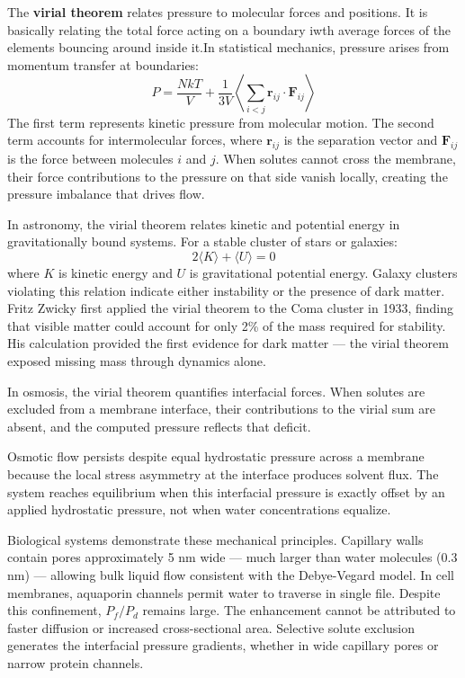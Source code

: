The \textbf{virial theorem} relates pressure to molecular forces and positions. It is basically relating the total force acting on a boundary iwth average forces of the elements bouncing around inside it.In statistical mechanics, pressure arises from momentum transfer at boundaries:
\[
P = \frac{NkT}{V} + \frac{1}{3V}\left\langle \sum_{i<j} \mathbf{r}_{ij} \cdot \mathbf{F}_{ij} \right\rangle
\]
The first term represents kinetic pressure from molecular motion. The second term accounts for intermolecular forces, where $\mathbf{r}_{ij}$ is the separation vector and $\mathbf{F}_{ij}$ is the force between molecules $i$ and $j$. When solutes cannot cross the membrane, their force contributions to the pressure on that side vanish locally, creating the pressure imbalance that drives flow.

In astronomy, the virial theorem relates kinetic and potential energy in gravitationally bound systems. For a stable cluster of stars or galaxies:
\[
2\langle K \rangle + \langle U \rangle = 0
\]
where $K$ is kinetic energy and $U$ is gravitational potential energy. Galaxy clusters violating this relation indicate either instability or the presence of dark matter. Fritz Zwicky first applied the virial theorem to the Coma cluster in 1933, finding that visible matter could account for only 2\% of the mass required for stability. His calculation provided the first evidence for dark matter — the virial theorem exposed missing mass through dynamics alone.

In osmosis, the virial theorem quantifies interfacial forces. When solutes are excluded from a membrane interface, their contributions to the virial sum are absent, and the computed pressure reflects that deficit.

Osmotic flow persists despite equal hydrostatic pressure across a membrane because the local stress asymmetry at the interface produces solvent flux. The system reaches equilibrium when this interfacial pressure is exactly offset by an applied hydrostatic pressure, not when water concentrations equalize.

Biological systems demonstrate these mechanical principles. Capillary walls contain pores approximately 5 nm wide — much larger than water molecules (0.3 nm) — allowing bulk liquid flow consistent with the Debye-Vegard model. In cell membranes, aquaporin channels permit water to traverse in single file. Despite this confinement, $P_f / P_d$ remains large. The enhancement cannot be attributed to faster diffusion or increased cross-sectional area. Selective solute exclusion generates the interfacial pressure gradients, whether in wide capillary pores or narrow protein channels.

